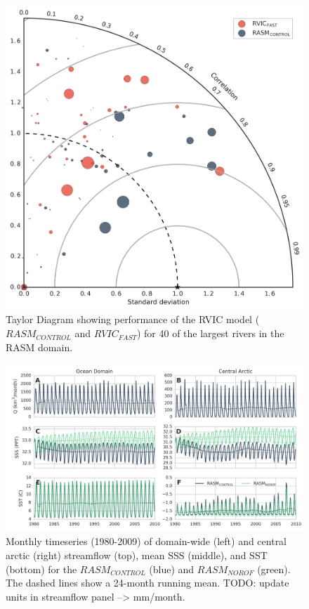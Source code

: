 \documentclass[jgrga, draft]{agutex}
\begin{document}
\clearpage
\begin{figure}
\noindent\includegraphics[width=40pc,natwidth=1]{R1010RBRbaaa01a_rvicfast_taylordiag}
\caption{Taylor Diagram showing performance of the RVIC model ($RASM_{CONTROL}$ and $RVIC_{FAST}$) for 40 of the largest rivers in the RASM domain.}
\label{fig:taylor}
\end{figure}

\clearpage
\begin{figure}
\noindent\includegraphics[width=40pc,natwidth=1]{ocean_combine_ts}
\caption{Monthly timeseries (1980-2009) of domain-wide (left) and central arctic (right) streamflow (top), mean SSS (middle), and SST (bottom) for the $RASM_{CONTROL}$ (blue) and $RASM_{NOROF}$ (green). The dashed lines show a 24-month running mean. TODO: update units in streamflow panel --> mm/month.}
\label{fig:ocean_timeseries}
\end{figure}
\end{document}
